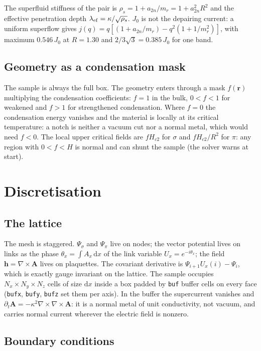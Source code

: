 \documentclass[11pt,a4paper]{article}
\newcommand{\Hc}[1]{H_{c#1}}
\newcommand{\code}[1]{\texttt{#1}}
\begin{document}
The superfluid stiffness of the pair is $\rho_s=1+a_{2n}/m_r=1+a_{2n}^2R^2$
and the effective penetration depth $\lambda_{\rm ef}=\kappa/\sqrt{\rho_s}$.
$J_0$ is not the depairing current: a uniform superflow gives
$j(q)=q[(1+a_{2n}/m_r)-q^2(1+1/m_r^2)]$, with maximum $0.546\,J_0$ at
$R=1.30$ and $2/3\sqrt3=0.385\,J_0$ for one band.

\subsection{Geometry as a condensation mask}

The sample is always the full box. The geometry enters through a mask
$f(\mathbf r)$ multiplying the condensation coefficients: $f=1$ in the
bulk, $0<f<1$ for weakened and $f>1$ for strengthened condensation. Where
$f=0$ the condensation energy vanishes and the material is locally at its
critical temperature: a notch is neither a vacuum cut nor a normal metal,
which would need $f<0$. The local upper critical fields
are $f\Hc2$ for $\sigma$ and $f\Hc2/R^2$ for $\pi$: any region with $0<f<H$
is normal and can shunt the sample (the solver warns at start).

\section{Discretisation}

\subsection{The lattice}

The mesh is staggered. $\Psi_\sigma$ and $\Psi_\pi$ live on nodes; the
vector potential lives on links as the phase
$\theta_x=\int A_x\,\mathrm dx$ of the link variable
$U_x=e^{-i\theta_x}$; the field $\mathbf h=\nabla\times\mathbf A$ lives on
plaquettes. The covariant derivative is $\Psi_{i+1}U_x(i)-\Psi_i$, which is
exactly gauge invariant on the lattice. The sample occupies
$N_x\times N_y\times N_z$ cells of size $\mathrm dx$ inside a box padded
by \code{buf} buffer cells on every face (\code{bufx}, \code{bufy},
\code{bufz} set them per axis). In the buffer the supercurrent vanishes and
$\partial_t\mathbf A=-\kappa^2\nabla\times\nabla\times\mathbf A$: it is a
normal metal of unit conductivity, not vacuum, and carries normal current
wherever the electric field is nonzero.

\subsection{Boundary conditions}
\end{document}
